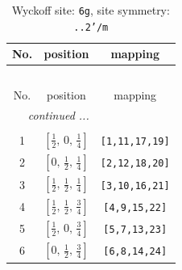 \documentclass[fleqn,8pt]{jsarticle}
\begin{document}
\renewcommand{\arraystretch}{1.2}
\begin{longtable}{ccc}
\caption{Wyckoff site: {\tt 6g}, site symmetry: {\tt ..2'/m}}
 \\
 \hline \hline
No. & position & mapping \\ \hline \endfirsthead

\multicolumn{2}{l}{\tablename\ \thetable{}} \\
 \hline \hline
No. & position & mapping \\ \hline \endhead

 \hline \hline
\multicolumn{2}{r}{\footnotesize\it continued ...} \\ \endfoot

 \hline \hline
\multicolumn{2}{r}{} \\ \endlastfoot

1 & $\left[ \frac{1}{2},\, 0,\, \frac{1}{4} \right]$ & {\tt [1,11,17,19]} \\ \hline
2 & $\left[ 0,\, \frac{1}{2},\, \frac{1}{4} \right]$ & {\tt [2,12,18,20]} \\ \hline
3 & $\left[ \frac{1}{2},\, \frac{1}{2},\, \frac{1}{4} \right]$ & {\tt [3,10,16,21]} \\ \hline
4 & $\left[ \frac{1}{2},\, \frac{1}{2},\, \frac{3}{4} \right]$ & {\tt [4,9,15,22]} \\ \hline
5 & $\left[ \frac{1}{2},\, 0,\, \frac{3}{4} \right]$ & {\tt [5,7,13,23]} \\ \hline
6 & $\left[ 0,\, \frac{1}{2},\, \frac{3}{4} \right]$ & {\tt [6,8,14,24]} \\
\end{longtable}
\renewcommand{\arraystretch}{1.2}
\end{document}
